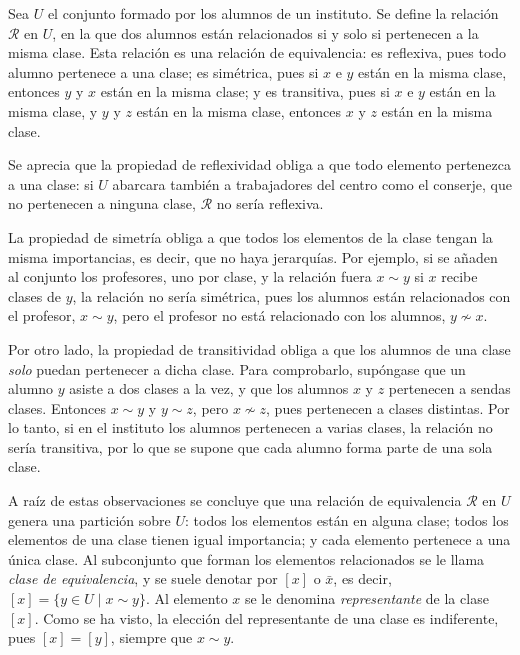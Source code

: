 \begin{TFGampliado}
    \begin{obs}
        Sea $U$ el conjunto formado por los alumnos de un instituto. Se define la relación $\mathcal{R}$ en $U$, en la que dos alumnos están relacionados si y solo si pertenecen a la misma clase. Esta relación es una relación de equivalencia: es reflexiva, pues todo alumno pertenece a una clase; es simétrica, pues si $x$ e $y$ están en la misma clase, entonces $y$ y $x$ están en la misma clase; y es transitiva, pues si $x$ e $y$ están en la misma clase, y $y$ y $z$ están en la misma clase, entonces $x$ y $z$ están en la misma clase.
        \item Se aprecia que la propiedad de reflexividad obliga a que todo elemento pertenezca a una clase: si $U$ abarcara también a trabajadores del centro como el conserje, que no pertenecen a ninguna clase, $\mathcal{R}$ no sería reflexiva.
        \item La propiedad de simetría obliga a que todos los elementos de la clase tengan la misma importancias, es decir, que no haya jerarquías. Por ejemplo, si se añaden al conjunto los profesores, uno por clase, y la relación fuera $x \sim y$ si $x$ recibe clases de $y$, la relación no sería simétrica, pues los alumnos están relacionados con el profesor, $x \sim y$, pero el profesor no está relacionado con los alumnos, $y \not \sim x$.
        \item Por otro lado, la propiedad de transitividad obliga a que los alumnos de una clase \textit{solo} puedan pertenecer a dicha clase. Para comprobarlo, supóngase que un alumno $y$ asiste a dos clases a la vez, y que los alumnos $x$ y $z$ pertenecen a sendas clases. Entonces $x \sim y$ y $y \sim z$, pero $x \not\sim z$, pues pertenecen a clases distintas. Por lo tanto, si en el instituto los alumnos pertenecen a varias clases, la relación no sería transitiva, por lo que se supone que cada alumno forma parte de una sola clase.
    
        \item A raíz de estas observaciones se concluye que una relación de equivalencia $\mathcal{R}$ en $U$ genera una partición sobre $U$: todos los elementos están en alguna clase; todos los elementos de una clase tienen igual importancia; y cada elemento pertenece a una única clase. Al subconjunto que forman los elementos relacionados se le llama \textit{clase de equivalencia}, y se suele denotar por $[x]$ o $\bar x$, es decir, $[x] = \{y\in U \mid x \sim y\}$. Al elemento $x$ se le denomina \textit{representante} de la clase $[x]$. Como se ha visto, la elección del representante de una clase es indiferente, pues $[x] = [y]$, siempre que $x \sim y$.
    \end{obs}
    

\end{TFGampliado}

